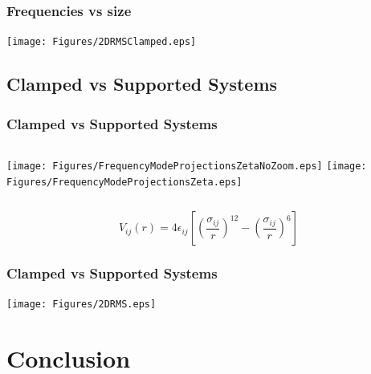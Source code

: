 \documentclass[hyperref={colorlinks=true,urlcolor=blue,linkcolor=.},aspectratio=1610,mathserif]{beamer}
\begin{document}
\begin{frame}
 \frametitle{Frequencies vs size}
 \begin{center}
  \texttt{[image: Figures/2DRMSClamped.eps]}
 \end{center}
\end{frame}

\subsection{Clamped vs Supported Systems}

\begin{frame}
 \frametitle{Clamped vs Supported Systems}
 \begin{columns}[T]
  \texttt{[image: Figures/FrequencyModeProjectionsZetaNoZoom.eps]}
  \texttt{[image: Figures/FrequencyModeProjectionsZeta.eps]}
 \end{columns}
 \begin{equation}
        V_{ij}(r) = 4 \epsilon_{ij} \left[ \left( \frac{\sigma_{ij}}{r} \right) ^{12} - \left( \frac{\sigma_{ij}}{r} \right) ^6 \right] \nonumber
 \end{equation}
\end{frame}

\begin{frame}
 \frametitle{Clamped vs Supported Systems}
 \begin{center}
  \texttt{[image: Figures/2DRMS.eps]}
 \end{center}
\end{frame}

\section{Conclusion}
\end{document}
